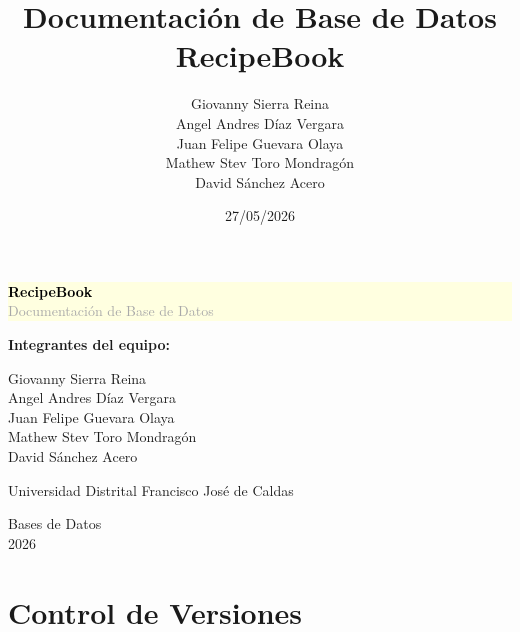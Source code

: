 \documentclass[12pt,a4paper]{article}
\title{Documentación de Base de Datos \\ \large RecipeBook}
\author{
    Giovanny Sierra Reina \\
    Angel Andres Díaz Vergara \\
    Juan Felipe Guevara Olaya \\
    Mathew Stev Toro Mondragón \\
    David Sánchez Acero
}
\date{27/05/2026}
\begin{document}
\pagestyle{fancy}
\fancyhf{}
\renewcommand{\headrulewidth}{0pt}
\renewcommand{\footrulewidth}{0pt}
\fancyhead[L]{\textcolor{darkgray}{RecipeBook}}
\fancyhead[R]{\textcolor{darkgray}{Documentación de Base de Datos}}
\fancyfoot[C]{\textcolor{darkgray}{\thepage}}
\setlength{\headheight}{14pt}

\begin{titlepage}
    \centering

    \vspace*{2cm}

    \colorbox{lightyellow}{\parbox{0.9\textwidth}{\centering
        {\Huge\bfseries\textcolor{black}{RecipeBook}}\\[0.5em]
        {\Large\textcolor{darkgray}{Documentación de Base de Datos}}\\[0.5em]
    }}

    \vspace{1.5cm}

    \vspace{2cm}

    \textbf{Integrantes del equipo:}

    \vspace{0.5cm}

    Giovanny Sierra Reina\\
    Angel Andres Díaz Vergara\\
    Juan Felipe Guevara Olaya\\
    Mathew Stev Toro Mondragón\\
    David Sánchez Acero

    \vfill

    {\Large Universidad Distrital Francisco José de Caldas\par}

    \vspace{0.3cm}

    Bases de Datos\\
    2026

\end{titlepage}

\section*{Control de Versiones}
\end{document}
